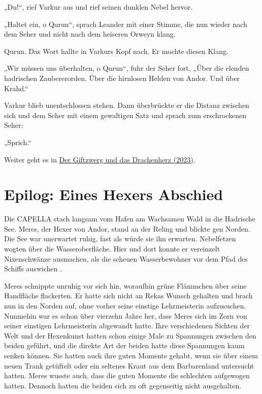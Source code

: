 „Du!“, rief Varkur aus und rief seinen dunklen Nebel hervor.

„Haltet ein, o Qurun“, sprach Leander mit einer Stimme, die nun wieder nach dem Seher und nicht nach dem heiseren Orweyn klang.

Qurun. Das Wort hallte in Varkurs Kopf nach. Er mochte diesen Klang.

„Wir müssen uns überhalten, o Qurun“, fuhr der Seher fort, „Über die elenden hadrischen Zaubererorden. Über die hirnlosen Helden von Andor. Und über Krahd.“

Varkur blieb unentschlossen stehen. Dann überbrückte er die Distanz zwischen sich und dem Seher mit einem gewaltigen Satz und sprach zum erschrockenen Seher:

„Sprich.“

\begin{commentbox}
    Weiter geht es in \hyperref[2023-der-giftzwerg-und-das-drachenherz]{Der Giftzwerg und das Drachenherz (2023)}.
\end{commentbox}












\newpage
\section{Epilog: Eines Hexers Abschied}



Die CAPELLA stach langsam vom Hafen am Wachsamen Wald in die Hadrische See. Meres, der Hexer von Andor, stand an der Reling und blickte gen Norden. Die See war unerwartet ruhig, fast als würde sie ihn erwarten. Nebelfetzen wogten über die Wasseroberfläche. Hier und dort konnte er vereinzelt Nixenschwänze ausmachen, als die scheuen Wasserbewohner vor dem Pfad des Schiffs auswichen .

Meres schnippte unruhig vor sich hin, woraufhin grüne Flämmchen über seine Handfläche flackerten. Er hatte sich nicht an Rekas Wunsch gehalten und brach nun in den Norden auf, ohne vorher seine einstige Lehrmeisterin aufzusuchen. Nunmehin war es schon über vierzehn Jahre her, dass Meres sich im Zorn von seiner einstigen Lehrmeisterin abgewandt hatte. Ihre verschiedenen Sichten der Welt und der Hexenkunst hatten schon einige Male zu Spannungen zwischen den beiden geführt, und die direkte Art der beiden hatte diese Spannungen kaum senken können. Sie hatten auch ihre guten Momente gehabt, wenn sie über einem neuen Trank getüftelt oder ein seltenes Kraut aus dem Barbarenland untersucht hatten. Meres wusste auch, dass die guten Momente die schlechten aufgewogen hatten. Dennoch hatten die beiden sich zu oft gegenseitig nicht ausgehalten.

